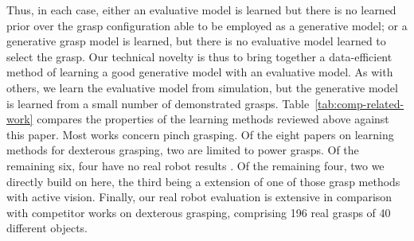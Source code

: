 Thus, in each case, either an evaluative model is learned but there is no learned prior over the grasp configuration able to be employed as a generative model; or a generative grasp model is learned, but there is no evaluative model learned to select the grasp. Our technical novelty is thus to bring together a data-efficient method of learning a good generative model with an evaluative model. As with others, we learn the evaluative model from simulation, but the generative model is learned from a small number of demonstrated grasps. Table~\ref{tab:comp-related-work} compares the properties of the learning methods reviewed above against this paper. Most works concern pinch grasping. Of the eight papers on learning methods for dexterous grasping, two \cite{varley2015generating,lu2017planning} are limited to power grasps. Of the remaining six, four have no real robot results \cite{veres2017modeling,zhou20176dof,kappler2015leveraging,mandikal2021dexterous}. Of the remaining four, two we directly build on here, the third being a extension of one of those grasp methods with active vision. Finally, our real robot evaluation is extensive in comparison with competitor works on dexterous grasping, comprising 196 real grasps of 40 different objects.

%
%
%
